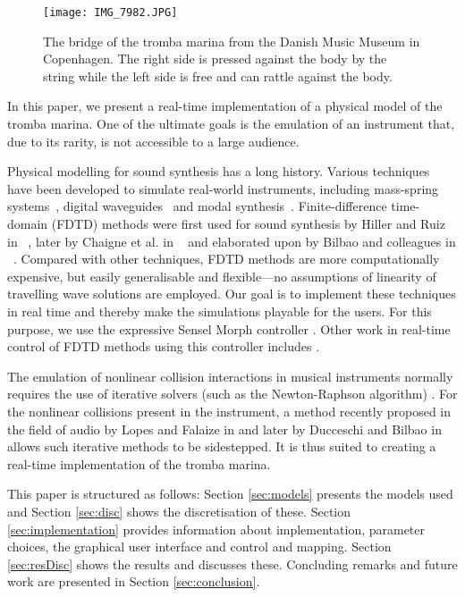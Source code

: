 \documentclass[dvipsnames, pdftex]{article}
\begin{document}
  \begin{figure}
  \centering
  \texttt{[image: IMG\_7982.JPG]}
  \caption{The bridge of the tromba marina from the Danish Music Museum in Copenhagen. The right side is pressed against the body by the string while the left side is free and can rattle against the body.}
  \label{fig:bridge}
\end{figure}

In this paper, we present a real-time implementation of a physical model of the tromba marina. One of the ultimate goals is the emulation of an instrument that, due to its rarity, is not accessible to a large audience.

Physical modelling for sound synthesis has a long history. Various techniques have been developed to simulate real-world instruments, including mass-spring systems~\cite{cadoz79}, digital waveguides~\cite{smith1992physical} and modal synthesis~\cite{morrison1993mosaic}.
Finite-difference time-domain (FDTD) methods were first used for sound synthesis by Hiller and Ruiz in ~\cite{Ruiz1969, Hiller1971, Hiller2}, later by Chaigne et al. in ~\cite{Chaigne92, Chaigne} and elaborated upon by Bilbao and colleagues in ~\cite{bilbao2009numerical, Bilbao2018:Tutorial}. Compared with other techniques, FDTD methods are more computationally expensive, but easily generalisable and flexible---no assumptions of linearity of travelling wave solutions are employed. Our goal is to implement these techniques in real time and thereby make the simulations playable for the users. For this purpose, we use the expressive Sensel Morph controller \cite{sensel2020}. Other work in real-time control of FDTD methods using this controller includes \cite{Willemsen2019a:SMC2020}. 

The emulation of nonlinear collision interactions in musical instruments normally requires the use of iterative solvers (such as the Newton-Raphson algorithm) \cite{Bilbao15}. For the nonlinear collisions present in the instrument, a method recently proposed in the field of audio by Lopes and Falaize in \cite{Lopes:SMC2020, Falaize2016a:SMC2020, Falaize2016b:SMC2020} and later by Ducceschi and Bilbao in~\cite{Ducceschi2019} allows such iterative methods to be sidestepped. It is thus suited  to creating a real-time implementation of the tromba marina.

This paper is structured as follows: Section \ref{sec:models} presents the models used and Section \ref{sec:disc} shows the discretisation of these. Section \ref{sec:implementation} provides information about implementation, parameter choices, the graphical user interface and control and mapping. Section \ref{sec:resDisc} shows the results and discusses these. Concluding remarks and future work are presented in Section \ref{sec:conclusion}.
\end{document}

